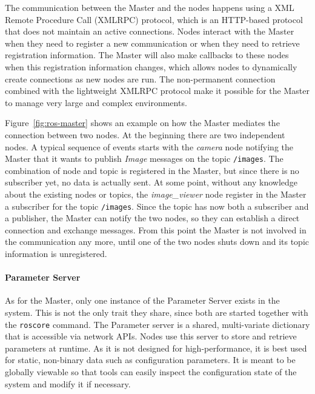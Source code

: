 The communication between the Master and the nodes happens using a XML Remote Procedure Call (XMLRPC) protocol, which is an HTTP-based protocol that does not maintain an active connections. Nodes interact with the Master when they need to register a new communication or when they need to retrieve registration information. The Master will also make callbacks to these nodes when this registration information changes, which allows nodes to dynamically create connections as new nodes are run. The non-permanent connection combined with the lightweight XMLRPC protocol make it possible for the Master to manage  very large and complex environments.

Figure~\ref{fig:ros-master} shows an example on how the Master mediates the connection between two nodes. At the beginning there are two independent nodes. A typical sequence of events starts with the \textit{camera} node notifying the Master that it wants to publish \textit{Image} messages on the topic \texttt{/images}. The combination of node and topic is registered in the Master, but since there is no subscriber yet, no data is actually sent. At some point, without any knowledge about the existing nodes or topics, the \textit{image\_viewer} node register in the Master a subscriber for the topic \texttt{/images}. Since the topic has now both a subscriber and a publisher, the Master can notify the two nodes, so they can establish a direct connection and exchange messages. From this point the Master is not involved in the communication any more, until one of the two nodes shuts down and its topic information is unregistered.

\paragraph{Parameter Server}  As for the Master, only one instance of the Parameter Server exists in the system. This is not the only trait they share, since both are started together with the \texttt{roscore} command. The Parameter server is a shared, multi-variate dictionary that is accessible via network APIs. Nodes use this server to store and retrieve parameters at runtime. As it is not designed for high-performance, it is best used for static, non-binary data such as configuration parameters. It is meant to be globally viewable so that tools can easily inspect the configuration state of the system and modify it if necessary.

